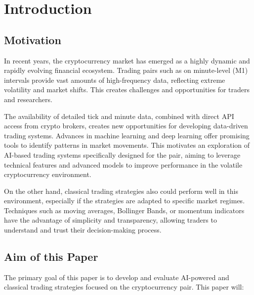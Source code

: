 \section{Introduction}

\subsection{Motivation}

In recent years, the cryptocurrency market has emerged as a highly dynamic and rapidly evolving financial ecosystem.
Trading pairs such as \ethusdc on minute-level (M1) intervals provide vast amounts of high-frequency data, reflecting extreme volatility and market shifts.
This creates challenges and opportunities for traders and researchers.

The availability of detailed tick and minute data, combined with direct API access from crypto brokers, creates new opportunities for developing data-driven trading systems.
Advances in machine learning and deep learning offer promising tools to identify patterns in market movements.
This motivates an exploration of AI-based trading systems specifically designed for the \ethusdc pair, aiming to leverage technical features and advanced models to improve performance in the volatile cryptocurrency environment.

On the other hand, classical trading strategies also could perform well in this environment, especially if the strategies are adapted to specific market regimes.
Techniques such as moving averages, Bollinger Bands, or momentum indicators have the advantage of simplicity and transparency, allowing traders to understand and trust their decision-making process.


\subsection{Aim of this Paper}

The primary goal of this paper is to develop and evaluate AI-powered and classical trading strategies focused on the \ethusdc cryptocurrency pair.
This paper will:

